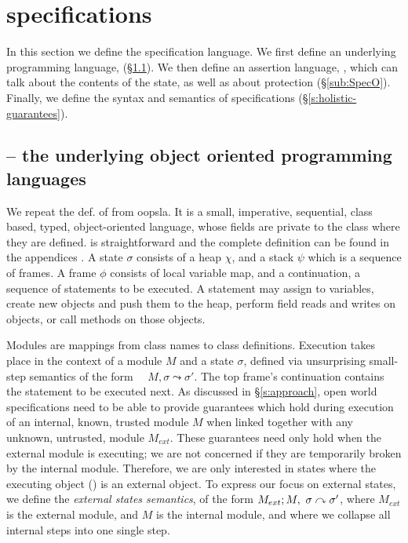 \section{\SpecLang specifications}
\label{s:semantics}

 
In this section we define {the}  \SpecLang specification language.  
We first define an underlying programming language, \LangOO (\S \ref{sub:Loo}).
We then define an assertion language, \AssertLang, which can talk about the
contents of the state, as well as about protection (\S \ref{sub:SpecO}).  Finally, we define the syntax and
semantics of  \SpecLang
specifications (\S \ref{s:holistic-guarantees}).


\subsection{\LangOO -- the underlying object oriented programming languages}
\label{sub:Loo} 
We repeat the def. of  \LangOO from oopsla. It is a {small}, imperative, sequential, 
class based, typed, object-oriented language, whose
fields are private to the class where they are defined. 
\LangOO is straightforward
{and the complete definition can be found in the appendices %
\cite{necessityFull}.}
 A \LangOO state $\sigma$ consists of a 
heap $\chi$, and a  {stack $\psi$ which is a sequence of frames}.
A frame $\phi$ consists of
local variable map, and a continuation, \ie a sequence of statements to be executed.
 A statement may assign to variables, create new objects and push them to the heap, 
perform field reads and writes on objects,  or
 call methods on those objects. 

 
Modules are mappings from class names to class definitions. 
Execution 
takes place
 in the context of  a module $M$ and   a state $\sigma$,
 defined via unsurprising small-step semantics of the form \ \ 
   $M, \sigma \leadsto \sigma'$.
The   top frame's continuation contains the statement to be 
executed next.  
As discussed in \S \ref{s:approach}, 
{open world specifications need to be able to provide}
guarantees which hold
during execution of an internal, 
known, trusted module $M$ when linked together with any
unknown, untrusted, module $M_{ext}$. These guarantees need only hold 
when the external module is executing; we are not concerned if they are
temporarily broken by the internal module. Therefore, we are only interested in states where the
executing object (\prg{this}) is an external object. 
To express our focus on external states, we define the  \emph{external states semantics}, of the form 
$M_{ext} ; M,\ \sigma \curvearrowright \sigma'$, where $M_{ext}$ is the external
module, and $M$ is the internal module, and where we
collapse all internal steps into one single step.

